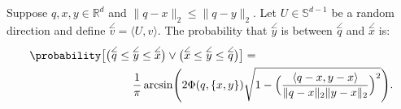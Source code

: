 \begin{lemma}
    \label{lemma:branch-and-bound:randomized:two-points}
    Suppose $q, x, y \in \mathbb{R}^d$ and $\lVert q - x \rVert_2 \leq \lVert q - y \rVert_2$.
    Let $U \in \mathbb{S}^{d-1}$ be a random direction and define
    $\overset{\angle}{v} = \langle U, v \rangle$.
    The probability that $\overset{\angle}{y}$ is between $\overset{\angle}{q}$ and $\overset{\angle}{x}$
    is:
    \begin{align*}
        \probability\big[
            \big( \overset{\angle}{q} \leq \overset{\angle}{y} \leq \overset{\angle}{x} \big) \lor
            \big( \overset{\angle}{x} \leq \overset{\angle}{y} \leq \overset{\angle}{q} \big) \big] &= \\
        \frac{1}{\pi} \arcsin \Biggl( 2 \Phi(q, \{ x, y\})
            & \sqrt{1 - \Big(
                \frac{\langle q - x, y - x \rangle}{\lVert q - x \rVert_2 \lVert y - x \rVert_2}
            \Big)^2}
        \Biggr).
    \end{align*}
\end{lemma}
